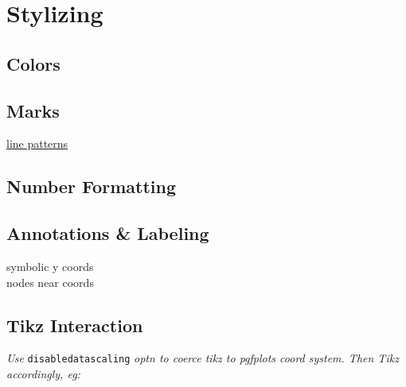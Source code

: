 \section{Stylizing}

\subsection*{Colors}






\subsection*{Marks}

\href{https://tex.stackexchange.com/questions/45275/tikz-get-values-for-predefined-dash-patterns}{line patterns}



\subsection*{Number Formatting}




\subsection*{Annotations \& Labeling}

{\color{blue}
\begin{minipage}[t]{3.0cm}
symbolic y coords\\
nodes near coords\\
\end{minipage}}


\subsection*{Tikz Interaction}
\textit{Use }\texttt{disabledatascaling}\textit{ opt\textquotesingle n to coerce tikz to pgfplots coord system. Then Tikz accordingly, eg:}

\\